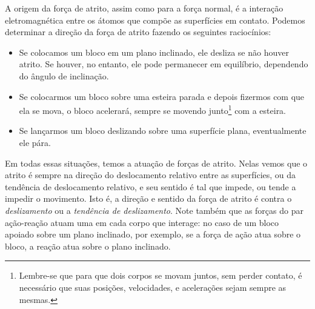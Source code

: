 A origem da força de atrito, assim como para a força normal, é a interação eletromagnética entre os átomos que compõe as superfícies em contato. Podemos determinar a direção da força de atrito fazendo os seguintes raciocínios:
\begin{itemize}
    \item Se colocamos um bloco em um plano inclinado, ele desliza se não houver atrito. Se houver, no entanto, ele pode permanecer em equilíbrio, dependendo do ângulo de inclinação.
    \item Se colocarmos um bloco sobre uma esteira parada e depois fizermos com que ela se mova, o bloco acelerará, sempre se movendo junto\footnote{Lembre-se que para que dois corpos se movam juntos, sem perder contato, é necessário que suas posições, velocidades, e acelerações sejam sempre as mesmas.} com a esteira.
    \item Se lançarmos um bloco deslizando sobre uma superfície plana, eventualmente ele pára.
\end{itemize}
%
Em todas essas situações, temos a atuação de forças de atrito. Nelas vemos que o atrito é sempre na direção do deslocamento relativo entre as superfícies, ou da tendência de deslocamento relativo, e seu sentido é tal que impede, ou tende a impedir o movimento. Isto é, a direção e sentido da força de atrito é contra o \emph{deslizamento} ou a \emph{tendência de deslizamento}. Note também que as forças do par ação-reação atuam uma em cada corpo que interage: no caso de um bloco apoiado sobre um plano inclinado, por exemplo, se a força de ação atua sobre o bloco, a reação atua sobre o plano inclinado.



